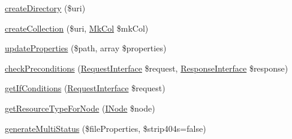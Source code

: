 \begin{DoxyCompactItemize}
\item 
\mbox{\hyperlink{class_sabre_1_1_d_a_v_1_1_server_afca5686d4605849f23e7839d1337ec46}{create\+Directory}} (\$uri)
\item 
\mbox{\hyperlink{class_sabre_1_1_d_a_v_1_1_server_a298d919004cda95434da7e82991ba148}{create\+Collection}} (\$uri, \mbox{\hyperlink{class_sabre_1_1_d_a_v_1_1_mk_col}{Mk\+Col}} \$mk\+Col)
\item 
\mbox{\hyperlink{class_sabre_1_1_d_a_v_1_1_server_a1c2710fe972d61aa21cf263f827fc91a}{update\+Properties}} (\$path, array \$properties)
\item 
\mbox{\hyperlink{class_sabre_1_1_d_a_v_1_1_server_af6a7d75d46fb08c27d7c33b00300de96}{check\+Preconditions}} (\mbox{\hyperlink{interface_sabre_1_1_h_t_t_p_1_1_request_interface}{Request\+Interface}} \$request, \mbox{\hyperlink{interface_sabre_1_1_h_t_t_p_1_1_response_interface}{Response\+Interface}} \$response)
\item 
\mbox{\hyperlink{class_sabre_1_1_d_a_v_1_1_server_a13e3d57b6eb70a17ae9049cf8bfad5b9}{get\+If\+Conditions}} (\mbox{\hyperlink{interface_sabre_1_1_h_t_t_p_1_1_request_interface}{Request\+Interface}} \$request)
\item 
\mbox{\hyperlink{class_sabre_1_1_d_a_v_1_1_server_a15556fd8a40b1ba79191480ad3ee7166}{get\+Resource\+Type\+For\+Node}} (\mbox{\hyperlink{interface_sabre_1_1_d_a_v_1_1_i_node}{I\+Node}} \$node)
\item 
\mbox{\hyperlink{class_sabre_1_1_d_a_v_1_1_server_a4991555e050de651f494817871e920f0}{generate\+Multi\+Status}} (\$file\+Properties, \$strip404s=false)
\end{DoxyCompactItemize}
